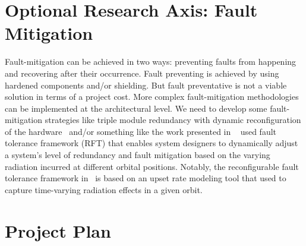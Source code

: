 %
%

\section{Optional Research Axis: Fault Mitigation}
Fault-mitigation can be achieved in two ways: preventing faults from happening and
recovering after their occurrence. Fault preventing is achieved by using hardened components and/or shielding. But fault preventative is not a viable solution in terms of a project cost. More complex fault-mitigation methodologies can be implemented at the architectural level. We need to develop some fault-mitigation strategies like triple module redundancy with  dynamic reconfiguration of the hardware~\cite{jacobs2012reconfigurable} and/or something like the work presented in 
~\cite{jacobs2012reconfigurable} used fault tolerance framework (RFT) that enables system designers to dynamically adjust a system's level of redundancy and fault mitigation based on the varying radiation incurred at different orbital positions. Notably, the reconfigurable fault tolerance framework in~\cite{jacobs2012reconfigurable} is based on an upset rate modeling tool that used to capture time-varying radiation effects in a given orbit.


\section{Project Plan}


